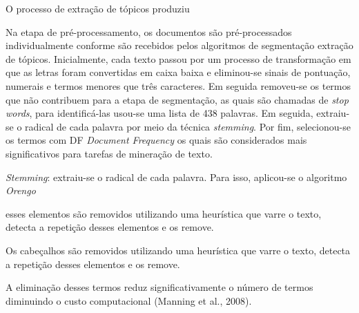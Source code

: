 O processo de extração de tópicos produziu 












Na etapa de pré-processamento, os documentos são pré-processados individualmente conforme são recebidos pelos algoritmos de segmentação extração de tópicos. 
Inicialmente, cada texto passou por um processo de transformação em que as letras foram convertidas em caixa baixa e eliminou-se sinais de pontuação, numerais e termos menores que três caracteres. Em seguida removeu-se os termos que não contribuem para a etapa de segmentação, as quais são chamadas de \textit{stop words}, para identificá-las usou-se uma lista de 438 palavras. Em seguida, extraiu-se o radical de cada palavra por meio da técnica \textit{stemming}. Por fim, selecionou-se os termos com DF \textit{Document Frequency}  os quais são considerados mais significativos para tarefas de mineração de texto.



\textit{Stemming}: extraiu-se o radical de cada palavra. Para isso, aplicou-se o algoritmo \textit{Orengo} %













esses elementos são removidos utilizando uma heurística que varre o texto, detecta a repetição desses elementos e os remove.


Os cabeçalhos são removidos utilizando uma heurística que varre o texto, detecta a repetição desses elementos e os remove.

A eliminação desses termos reduz significativamente o número de termos diminuindo o custo computacional (Manning et al., 2008).






























